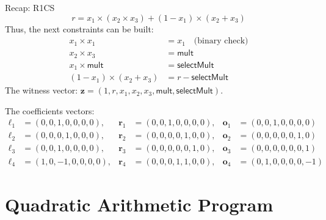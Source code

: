 \documentclass{zkdl-presentation-template}
\begin{document}
    \begin{frame}{Recap: R1CS}
        \vspace{-10pt}
        \begin{equation*}
            r = x_1 \times (x_2 \times x_3) + (1 - x_1) \times (x_2 + x_3)
        \end{equation*}
        \pause
        Thus, the next constraints can be built:
        \vspace{-5pt}
        \begin{align*}
            x_1 \times x_1 &= x_1 \quad \text{(binary check)} \tag{1} \\
            x_2 \times x_3 &= \mathsf{mult} \tag{2} \\
            x_1 \times \mathsf{mult} &= \mathsf{selectMult} \tag{3} \\
            (1 - x_1) \times (x_2 + x_3) &= r - \mathsf{selectMult} \tag{4}
        \end{align*}
        \pause
        The witness vector: $\mathbf{z} = (1, r, x_1, x_2, x_3, \mathsf{mult}, \mathsf{selectMult})$.
        \pause

        \vspace{2pt}
        The coefficients vectors:
        \vspace{-25pt}
        {\center\small\begin{align*}
            \boldsymbol{\ell}_1 &= (0, 0, 1, 0, 0, 0, 0), & \boldsymbol{r}_1 &= (0, 0, 1, 0, 0, 0, 0), & \boldsymbol{o}_1 &= (0, 0, 1, 0, 0, 0, 0) \\
            \boldsymbol{\ell}_2 &= (0, 0, 0, 1, 0, 0, 0), & \boldsymbol{r}_2 &= (0, 0, 0, 0, 1, 0, 0), & \boldsymbol{o}_2 &= (0, 0, 0, 0, 0, 1, 0) \\
            \boldsymbol{\ell}_3 &= (0, 0, 1, 0, 0, 0, 0), & \boldsymbol{r}_3 &= (0, 0, 0, 0, 0, 1, 0), & \boldsymbol{o}_3 &= (0, 0, 0, 0, 0, 0, 1) \\
            \boldsymbol{\ell}_4 &= (1, 0, -1, 0, 0, 0, 0), & \boldsymbol{r}_4 &= (0, 0, 0, 1, 1, 0, 0), & \boldsymbol{o}_4 &= (0, 1, 0, 0, 0, 0, -1)
        \end{align*}}
    \end{frame}

    \section[QAP]{Quadratic Arithmetic Program}
\end{document}
